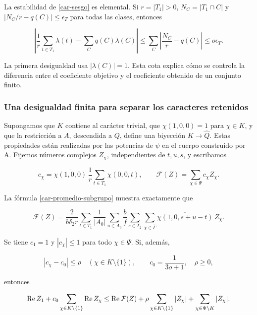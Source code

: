 La estabilidad de \eqref{car-sesgo} es elemental. Si $r=|T_1|>0$, $N_C=|T_1\cap C|$ y $|N_C/r-q(C)|\le\epsilon_T$ para todas las clases, entonces

\begin{equation}
\left|\frac1r\sum_{t\in T_1}\lambda(t)-\sum_Cq(C)\lambda(C)\right|
\le\sum_C\left|\frac{N_C}{r}-q(C)\right|
\le o\epsilon_T.
\label{car-error-coeficientes}
\end{equation}

La primera desigualdad usa $|\lambda(C)|=1$. Esta cota explica cómo se controla la diferencia entre el coeficiente objetivo y el coeficiente obtenido de un conjunto finito.

\subsubsection*{Una desigualdad finita para separar los caracteres retenidos}

Supongamos que $K$ contiene al carácter trivial, que $\chi(1,0,0)=1$ para $\chi\in K$, y que la restricción a $A$, descendida a $Q$, define una biyección $K\to\widehat Q$. Estas propiedades están realizadas por las potencias de $\psi$ en el cuerpo construido por A. Fijemos números complejos $Z_\chi$, independientes de $t,u,s$, y escribamos

\begin{equation}
c_\chi=\overline{\chi(1,0,0)}\,
\frac1r\sum_{t\in T_1}\chi(0,0,t),
\qquad
\mathcal F(Z)=\sum_{\chi\in\Psi}c_\chi Z_\chi.
\label{car-funcional}
\end{equation}

La fórmula \eqref{car-promedio-subgrupo} muestra exactamente que

\begin{equation}
\mathcal F(Z)
=\frac{2}{b\delta_2 r}\sum_{t\in T_1}
\frac1{|A_0|}\sum_{u\in A_0}
\frac b f\sum_{s\in T_2}\sum_{\chi\in\widehat\Gamma}
\overline{\chi(1,0,s+u-t)}\,Z_\chi.
\label{car-promedio-completo}
\end{equation}

Se tiene $c_1=1$ y $|c_\chi|\le1$ para todo $\chi\in\Psi$. Si, además,

\[
|c_\chi-c_0|\le\rho\quad(\chi\in K\setminus\{1\}),
\qquad c_0=\frac1{3o+1},\quad\rho\ge0,
\]

entonces

\begin{equation}
\operatorname{Re} Z_1+c_0\sum_{\chi\in K\setminus\{1\}}\operatorname{Re} Z_\chi
\le\operatorname{Re}\mathcal F(Z)
+\rho\sum_{\chi\in K\setminus\{1\}}|Z_\chi|
+\sum_{\chi\in\Psi\setminus K}|Z_\chi|.
\label{car-extraccion}
\end{equation}

